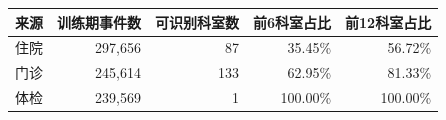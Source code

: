 \begin{tabular}{lrrrr}
\toprule
来源 & 训练期事件数 & 可识别科室数 & 前6科室占比 & 前12科室占比 \\
\midrule
住院 & 297,656 & 87 & 35.45\% & 56.72\% \\
门诊 & 245,614 & 133 & 62.95\% & 81.33\% \\
体检 & 239,569 & 1 & 100.00\% & 100.00\% \\
\bottomrule
\end{tabular}

